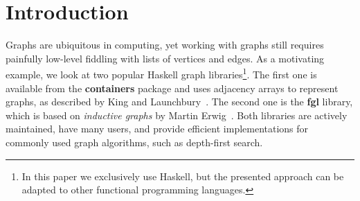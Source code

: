 \documentclass[acmlarge,anonymous]{acmart}\settopmatter{printfolios=true}
\begin{document}
\maketitle

\section{Introduction}

Graphs are ubiquitous in computing, yet working with graphs still requires
painfully low-level fiddling with lists of vertices and edges. As a motivating
example, we look at two popular Haskell graph libraries\footnote{In this paper
we exclusively use Haskell, but the presented approach can be adapted to
other functional programming languages.}. The first one is available from the
\textbf{\textsf{containers}} package and uses adjacency arrays to represent graphs,
as described by King and Launchbury~\citeyear{1995_king_graphs}. The second one
is the \textbf{\textsf{fgl}} library, which is based on \emph{inductive graphs}
by Martin Erwig~\citeyear{2001_erwig_inductive}. Both libraries are
actively maintained, have many users, and provide efficient implementations for
commonly used graph algorithms, such as depth-first search.
\end{document}
